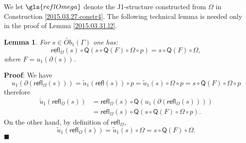 \documentclass[12pt]{article}
\numberwithin{equation}{section}
\newenvironment{myproof}{{\bf Proof}:}{$\blacksquare$ \vskip 5mm }
\newtheorem{lemma}[proposition]{Lemma}
\newcommand{\wt}{\widetilde}
\newcommand{\refl}{\mathsf{refl}}
\newcommand{\Q}{\mathsf{Q}}
\newcommand{\Obwt}{\wt{Ob}}
\begin{document}
%
We let $\gls{reflOmega}$ denote the J1-structure constructed from $\Omega$ in
Construction \ref{2015.03.27.constr4}.
%
The following technical lemma is needed only in the proof of Lemma
\ref{2015.03.31.l2}.
%
\begin{lemma}
\label{2015.04.02.l3} For $s\in \Obwt_1(\Gamma)$ one has:
%
$$\refl_{\Omega}(s)\circ \Q(s\circ \Q(F)\circ \Omega\circ p)=s\circ \Q(F)\circ
\Omega,$$
%
where $F=u_1(\partial(s))$.
\end{lemma}
%
\begin{myproof}
We have
%
$$u_1(\partial(\refl_{\Omega}(s)))=\wt{u}_1(\refl(s))\circ p=\wt{u}_1(s)\circ
\Omega\circ p=s\circ \Q(F)\circ \Omega\circ p$$
%
therefore
%
\begin{align*}
  \wt{u}_1(\refl_{\Omega}(s))
  & =\refl_{\Omega}(s)\circ \Q(u_1(\partial(\refl_{\Omega}(s)))) \\
  & = \refl_{\Omega}(s)\circ \Q(s\circ \Q(F)\circ \Omega\circ p).
\end{align*}
%
On the other hand, by definition of $\refl_{\Omega}$,
%
$$\wt{u}_1(\refl_{\Omega}(s))=\wt{u}_1(s)\circ \Omega=s\circ \Q(F)\circ \Omega.$$
%
\end{myproof}
\end{document}
